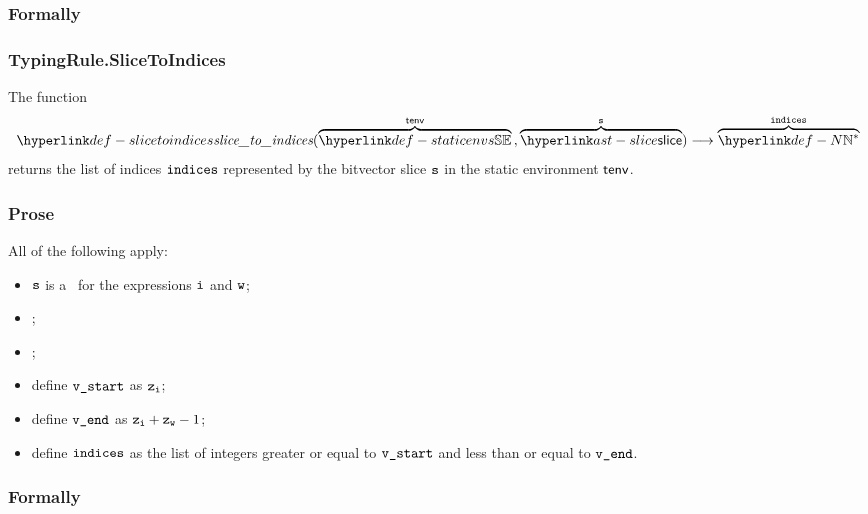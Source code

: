\subsubsection{Formally}
\begin{mathpar}
\end{mathpar}

\subsubsection{TypingRule.SliceToIndices\label{sec:TypingRule.SliceToIndices}}
\hypertarget{def-slicetoindices}{}
The function
\[
\slicetoindices(\overname{\staticenvs}{\tenv} \aslsep \overname{\slice}{\vs}) \aslto \overname{\N^*}{\indices}
\]
returns the list of indices $\indices$ represented by the bitvector slice $\vs$ in the static environment $\tenv$.

\subsubsection{Prose}
All of the following apply:
\begin{itemize}
  \item $\vs$ is a \lengthslice\ for the expressions $\vi$ and $\vw$;
  \item {};
  \item {};
  \item define $\vstart$ as $\vz_\vi$;
  \item define $\vend$ as $\vz_\vi + \vz_\vw - 1$;
  \item define $\indices$ as the list of integers greater or equal to $\vstart$ and less than or equal to $\vend$.
\end{itemize}

\subsubsection{Formally}
\begin{mathpar}
\end{mathpar}
